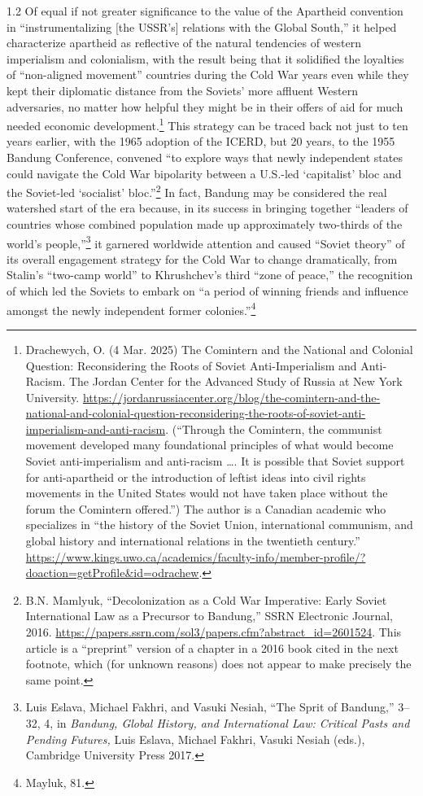 \documentclass[../unravbook.tex]{subfiles}
\begin{document}
\begin{spacing}{1.2}
Of equal if not greater significance to the value of the Apartheid convention in ``instrumentalizing [the USSR's] relations with the Global South,'' it helped characterize apartheid as reflective of the natural tendencies of western imperialism and colonialism, with the result being that it solidified the loyalties of ``non-aligned movement'' countries during the Cold War years even while they kept their diplomatic distance from the Soviets' more affluent Western adversaries, no matter how helpful they might be in their offers of aid for much needed economic development.\footnote{Drachewych, O. (4 Mar. 2025) The Comintern and the National and Colonial Question: Reconsidering the Roots of Soviet Anti-Imperialism and Anti-Racism. The Jordan Center for the Advanced Study of Russia at New York University.  \url{https://jordanrussiacenter.org/blog/the-comintern-and-the-national-and-colonial-question-reconsidering-the-roots-of-soviet-anti-imperialism-and-anti-racism}. (``Through the Comintern, the communist movement developed many foundational principles of what would become Soviet anti-imperialism and anti-racism \ldots. It is possible that Soviet support for anti-apartheid or the introduction of leftist ideas into civil rights movements in the United States would not have taken place without the forum the Comintern offered.'') The author is a Canadian academic who specializes in ``the history of the Soviet Union, international communism, and global history and international relations in the twentieth century.'' \url{https://www.kings.uwo.ca/academics/faculty-info/member-profile/?doaction=getProfile\&id=odrachew}.} This strategy can be traced back not just to ten years earlier, with the 1965 adoption of the ICERD, but 20 years, to the 1955 Bandung Conference, convened ``to explore ways that newly independent states could navigate the Cold War bipolarity between a U.S.-led `capitalist' bloc and the Soviet-led `socialist' bloc.''\footnote{B.N. Mamlyuk, ``Decolonization as a Cold War Imperative: Early Soviet International Law as a Precursor to Bandung,'' SSRN Electronic Journal, 2016. \url{https://papers.ssrn.com/sol3/papers.cfm?abstract_id=2601524}. This article is a ``preprint'' version of a chapter in a 2016 book cited in the next footnote, which (for unknown reasons) does not appear to make precisely the same point.} In fact, Bandung may be considered the real watershed start of the era because, in its success in bringing together \enquote{leaders of countries whose combined population made up approximately two-thirds of the world's people,}\footnote{Luis Eslava, Michael Fakhri, and Vasuki Nesiah, \enquote{The Sprit of Bandung,} 3--32, 4, in \textit{Bandung, Global History, and International Law: Critical Pasts and Pending Futures,} Luis Eslava, Michael Fakhri, Vasuki Nesiah (eds.), Cambridge University Press 2017.} it garnered worldwide attention and caused \enquote{Soviet theory} of its overall engagement strategy for the Cold War to change dramatically, from Stalin's \enquote{two-camp world} to Khrushchev's third \enquote{zone of peace,} the recognition of which led the Soviets to embark on \enquote{a period of winning friends and influence amongst the newly independent former colonies.}\footnote{Mayluk, 81.}


\end{spacing}
\end{document}
